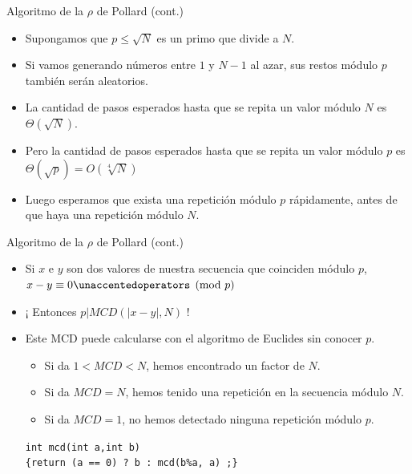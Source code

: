 \documentclass{beamer}
\begin{document}
\begin{frame}{Algoritmo de la $\rho$ de Pollard (cont.)}
    \begin{itemize}
      \item Supongamos que $p \leq \sqrt{N}$ es un primo que divide a $N$.
      \item Si vamos generando números entre $1$ y $N-1$ al azar, sus restos módulo $p$ también serán aleatorios.
      \item La cantidad de pasos esperados hasta que se repita un valor módulo $N$ es $\Theta(\sqrt{N})$.
      \item Pero la cantidad de pasos esperados hasta que se repita un valor módulo $p$ es $\Theta(\sqrt{p}) = O(\sqrt[4]{N})$
      \item Luego esperamos que exista una repetición módulo $p$ rápidamente, antes de que haya una repetición módulo $N$.
      \pause
    \end{itemize}
\end{frame}

\begin{frame}[fragile]{Algoritmo de la $\rho$ de Pollard (cont.)}
    \begin{itemize}
      \item Si $x$ e $y$ son dos valores de nuestra secuencia que coinciden módulo $p$, $x-y \equiv 0 \modulo{p}$
      \item ¡ Entonces $p | MCD(|x-y|,N)$ !
      \item Este MCD puede calcularse con el algoritmo de Euclides sin conocer $p$.
      \begin{itemize}
           \item Si da $1 < MCD < N$, hemos encontrado un factor de $N$.
           \item Si da $MCD=N$, hemos tenido una repetición en la secuencia módulo $N$.
           \item Si da $MCD=1$, no hemos detectado ninguna repetición módulo $p$.
      \end{itemize}
      
           \texttt{int mcd(int a,int b) \\ \{return (a == 0) ? b : mcd(b\%a, a) ;\} }
           
    \end{itemize}
\end{frame}
\end{document}
